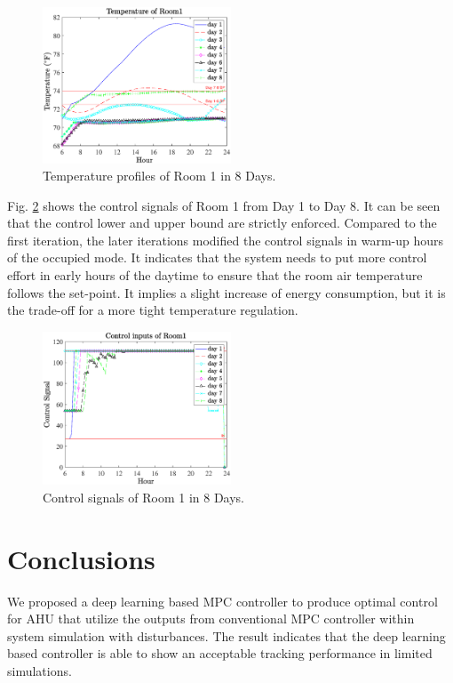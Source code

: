 \documentclass[conference]{IEEEtran}
\begin{document}
\begin{figure}[htbp]
\centerline{\includegraphics[width=0.5\textwidth]{Figures/ilc_results.eps}}
\caption{Temperature profiles of Room 1 in 8 Days.}
\label{figILC1}
\end{figure}

Fig. \ref{figILC1C} shows the control signals of Room 1 from Day 1 to Day 8. It can be seen that the control lower and upper bound are strictly enforced. Compared to the first iteration, the later iterations modified the control signals in warm-up hours of the occupied mode. It indicates that the system needs to put more control effort in early hours of the daytime to ensure that the room air temperature follows the set-point. It implies a slight increase of energy consumption, but it is the trade-off for a more tight temperature regulation.

\begin{figure}[htbp]
\centerline{\includegraphics[width=0.5\textwidth]{Figures/ilc_control.eps}}
\caption{Control signals of Room 1 in 8 Days.}
\label{figILC1C}
\end{figure}

\section{Conclusions}
We proposed a deep learning based MPC controller to produce optimal control for AHU that utilize the outputs from conventional MPC controller within system simulation with disturbances. The result indicates that the deep learning based controller is able to show an acceptable tracking performance in limited simulations.
\end{document}

